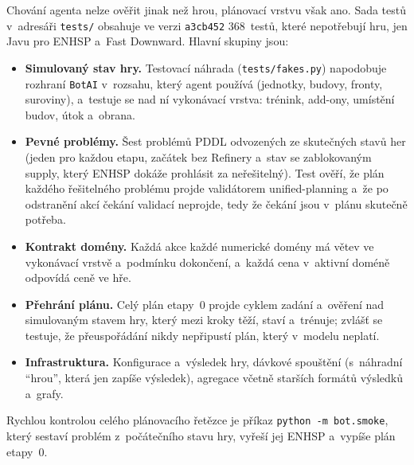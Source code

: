 Chování agenta nelze ověřit jinak než hrou, plánovací vrstvu však ano. Sada testů v~adresáři \texttt{tests/} obsahuje ve verzi \texttt{a3cb452} 368~testů, které nepotřebují hru, jen Javu pro ENHSP a~Fast Downward. Hlavní skupiny jsou:
\begin{itemize}
	\item \textbf{Simulovaný stav hry.} Testovací náhrada (\texttt{tests/fakes.py}) napodobuje rozhraní \texttt{BotAI} v~rozsahu, který agent používá (jednotky, budovy, fronty, suroviny), a~testuje se nad ní vykonávací vrstva: trénink, add-ony, umístění budov, útok a~obrana.
	\item \textbf{Pevné problémy.} Šest problémů PDDL odvozených ze skutečných stavů her (jeden pro každou etapu, začátek bez Refinery a~stav se zablokovaným supply, který ENHSP dokáže prohlásit za neřešitelný). Test ověří, že plán každého řešitelného problému projde validátorem unified-planning a~že po odstranění akcí čekání validací neprojde, tedy že čekání jsou v~plánu skutečně potřeba.
	\item \textbf{Kontrakt domény.} Každá akce každé numerické domény má větev ve vykonávací vrstvě a~podmínku dokončení, a~každá cena v~aktivní doméně odpovídá ceně ve hře.
	\item \textbf{Přehrání plánu.} Celý plán etapy~0 projde cyklem zadání a~ověření nad simulovaným stavem hry, který mezi kroky těží, staví a~trénuje; zvlášť se testuje, že přeuspořádání nikdy nepřipustí plán, který v~modelu neplatí.
	\item \textbf{Infrastruktura.} Konfigurace a~výsledek hry, dávkové spouštění (s~náhradní \enquote{hrou}, která jen zapíše výsledek), agregace včetně starších formátů výsledků a~grafy.
\end{itemize}
Rychlou kontrolou celého plánovacího řetězce je příkaz \texttt{python -m bot.smoke}, který sestaví problém z~počátečního stavu hry, vyřeší jej ENHSP a~vypíše plán etapy~0.
